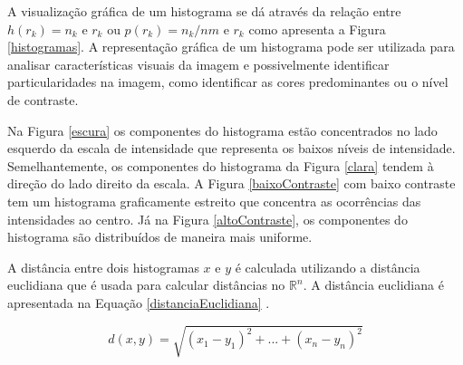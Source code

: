 A visualização gráfica de um histograma se dá através da relação entre $h(r_k) = n_k$ e $r_k$ ou $p(r_k) = n_k/{nm}$ e $r_k$ como apresenta a Figura \ref{histogramas}. A representação gráfica de um histograma pode ser utilizada para analisar características visuais da imagem e possivelmente identificar particularidades na imagem, como identificar as cores predominantes ou o nível de contraste.

Na Figura \ref{escura} os componentes do histograma estão concentrados no lado esquerdo da escala de intensidade que representa os baixos níveis de intensidade. Semelhantemente, os componentes do histograma da Figura \ref{clara} tendem à direção do lado direito da escala. A Figura \ref{baixoContraste} com baixo contraste tem um histograma graficamente estreito que concentra as ocorrências das intensidades ao centro. Já na Figura \ref{altoContraste}, os componentes do histograma são distribuídos de maneira mais uniforme.

A distância entre dois histogramas $x$ e $y$ é calculada utilizando a distância euclidiana que é usada para calcular distâncias no $\mathbb{R}^n$. A distância euclidiana é apresentada na Equação \ref{distanciaEuclidiana} \cite{deza}.

\begin{equation}
  \label{distanciaEuclidiana}
  d(x,y) = \sqrt{ (x_1 - y_1)^2 + ... + (x_n - y_n)^2 }
\end{equation}

